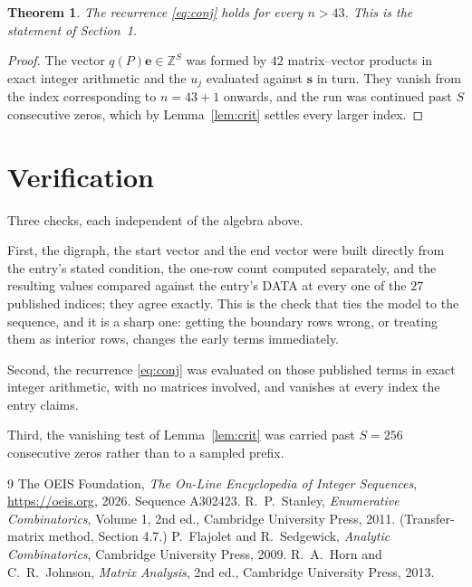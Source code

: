 \documentclass[11pt,a4paper]{article}
\theoremstyle{plain}
\newtheorem{theorem}{Theorem}
\theoremstyle{definition}
\begin{document}
\begin{theorem}
The recurrence \eqref{eq:conj} holds for every $n>43$. This is the statement of
Section~1.
\end{theorem}

\begin{proof}
The vector $q(P)\mathbf{e}\in\mathbb{Z}^{S}$ was formed by $42$ matrix--vector
products in exact integer arithmetic and the $u_j$ evaluated against $\mathbf{s}$ in turn.
They vanish from the index corresponding to $n=43+1$ onwards, and the run was continued
past $S$ consecutive zeros, which by Lemma~\ref{lem:crit} settles every larger index.
\end{proof}

\section{Verification}

Three checks, each independent of the algebra above.

First, the digraph, the start vector and the end vector were built directly from the
entry's stated condition, the one-row count computed separately, and the resulting values
compared against the entry's DATA at every one of the $27$ published indices; they
agree exactly. This is the check that ties the model to the sequence, and it is a sharp one:
getting the boundary rows wrong, or treating them as interior rows, changes the early terms
immediately.

Second, the recurrence \eqref{eq:conj} was evaluated on those published terms in exact
integer arithmetic, with no matrices involved, and vanishes at every index the entry claims.

Third, the vanishing test of Lemma~\ref{lem:crit} was carried past $S=256$ consecutive
zeros rather than to a sampled prefix.

\begin{thebibliography}{9}
 The OEIS Foundation, \emph{The On-Line Encyclopedia of Integer
Sequences}, \url{https://oeis.org}, 2026. Sequence A302423.
 R.~P.~Stanley, \emph{Enumerative Combinatorics}, Volume 1, 2nd ed.,
Cambridge University Press, 2011. (Transfer-matrix method, Section 4.7.)
 P.~Flajolet and R.~Sedgewick, \emph{Analytic Combinatorics}, Cambridge
University Press, 2009.
 R.~A.~Horn and C.~R.~Johnson, \emph{Matrix Analysis}, 2nd ed., Cambridge
University Press, 2013.
\end{thebibliography}
\end{document}
